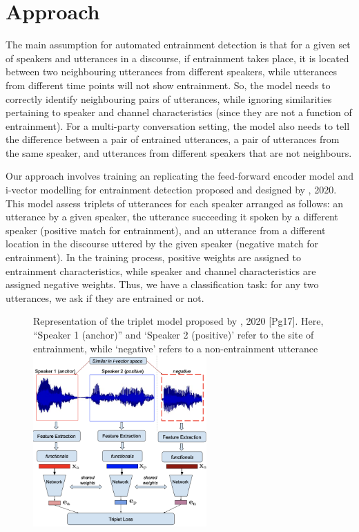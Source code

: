 \section{Approach}
    The main assumption for automated entrainment detection is that for a given set of speakers and utterances in a discourse, if entrainment takes place, it is located between two neighbouring utterances from different speakers, while utterances from different time points will not show entrainment. So, the model needs to correctly identify neighbouring pairs of utterances, while ignoring similarities pertaining to speaker and channel characteristics (since they are not a function of entrainment). For a multi-party conversation setting, the model also needs to tell the difference between a pair of entrained utterances, a pair of utterances from the same speaker, and utterances from different speakers that are not neighbours.

    Our approach involves training an replicating the feed-forward encoder model and i-vector modelling for entrainment detection proposed and designed by \citeauthor{nasir2020}, 2020. This model assess triplets of utterances for each speaker arranged as follows: an utterance by a given speaker, the utterance succeeding it spoken by a different speaker (positive match for entrainment), and an utterance from a different location in the discourse uttered by the given speaker (negative match for entrainment). In the training process, positive weights are assigned to entrainment characteristics, while speaker and channel characteristics are assigned negative weights. Thus, we have a classification task: for any two utterances, we ask if they are entrained or not.

    \begin{figure}
    \begin{sidecaption}{Representation of the triplet model proposed by \citeauthor{nasir2020}, 2020 [Pg17]. Here, ``Speaker 1 (anchor)'' and `Speaker 2 (positive)' refer to the site of entrainment, while `negative' refers to a non-entrainment utterance}
    \centering
    \includegraphics[width=0.6\textwidth]{images/triplet-model.png}
    \label{fig:sentiment_model_schematics}
    \end{sidecaption}
    \end{figure}

